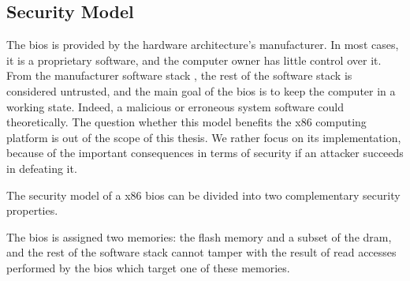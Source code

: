 \subsection{Security Model}
\label{subsec:usecase:firm:sec}

The \ac{bios} is provided by the hardware architecture’s manufacturer.
%
In most cases, it is a proprietary software, and the computer owner has little
control over it.
%
From the manufacturer software stack , the rest of the software stack is
considered untrusted, and the main goal of the \ac{bios} is to keep the computer
in a working state.
%
Indeed, a malicious or erroneous system software could theoretically. 
%
The question whether this model benefits the x86 computing platform is out of the
scope of this thesis. 
%
We rather focus on its implementation, because of the important consequences in
terms of security if an attacker succeeds in defeating it. 

The security model of a x86 \ac{bios} can be divided into two complementary
security properties. 

\begin{definition}
  \label{def:usecase:biosint}
  The \ac{bios} is assigned two memories: the flash memory  and a subset of the
  \ac{dram}, and the rest of the software stack cannot tamper with the result of
  read accesses performed by the \ac{bios} which target one of these memories.
\end{definition}

